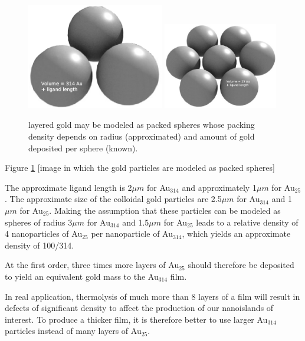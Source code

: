 \documentclass[12pt,oneside,english]{article}
\begin{document}
    \begin{figure}
        \includegraphics[width=60mm]{images/willitblend-big.eps}
        \includegraphics[width=50mm]{images/willitblend.eps}
        \caption{layered gold may be modeled as packed spheres whose packing density depends on radius (approximated) and amount of gold deposited per sphere (known).}
        \label{f:packed_spheres}
    \end{figure}
    Figure \ref{f:packed_spheres} [image in which the gold particles are modeled as packed spheres]    
    
    The approximate ligand length is 2${\mu}m$ for Au$_{314}$ and approximately 1${\mu}m$ for Au$_{25}$.
    The approximate size of the colloidal gold particles are 2.5${\mu}m$ for Au$_{314}$ and 1${\mu}m$ for Au$_{25}$.
    Making the assumption that these particles can be modeled as spheres of radius 3${\mu}m$ for Au$_{314}$ and 1.5${\mu}m$ for Au$_{25}$ leads to a relative density of 4 nanoparticles of Au$_{25}$ per nanoparticle of Au$_{314}$, which yields an approximate density of 100/314.
    
    At the first order, three times more layers of Au$_{25}$ should therefore be deposited to yield an equivalent gold mass to the Au$_{314}$ film.
    
    In real application, thermolysis of much more than 8 layers of a film will result in defects of significant density to affect the production of our nanoislands of interest.
    To produce a thicker film, it is therefore better to use larger Au$_{314}$ particles instead of many layers of Au$_{25}$.
\end{document}
